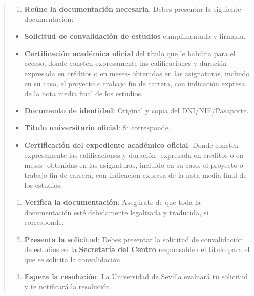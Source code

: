 \documentclass[12pt,a4paper,oneside]{report}
\begin{document}
\begin{itemize}
\begin{itemize}
\begin{quote}
\begin{enumerate}
  \item \textbf{Reúne la documentación necesaria}: Debes presentar la siguiente documentación:
\end{enumerate}
\begin{itemize}
  \item \textbf{Solicitud de convalidación de estudios} cumplimentada y firmada.
  \item \textbf{Certificación académica oficial} del título que le habilita para el acceso, donde consten expresamente las calificaciones y duración -expresada en créditos o en meses- obtenidas en las asignaturas, incluido en su caso, el proyecto o trabajo fin de carrera, con indicación expresa de la nota media final de los estudios.
  \item \textbf{Documento de identidad}: Original y copia del DNI/NIE/Pasaporte.
  \item \textbf{Título universitario oficial}: Si corresponde.
  \item \textbf{Certificación del expediente académico oficial}: Donde consten expresamente las calificaciones y duración -expresada en créditos o en meses- obtenidas en las asignaturas, incluido en su caso, el proyecto o trabajo fin de carrera, con indicación expresa de la nota media final de los estudios.
\end{itemize}
\begin{enumerate}
  \item \textbf{Verifica la documentación}: Asegúrate de que toda la documentación esté debidamente legalizada y traducida, si corresponde.
  \item \textbf{Presenta la solicitud}: Debes presentar la solicitud de convalidación de estudios en la \textbf{Secretaría del Centro} responsable del título para el que se solicita la convalidación.
  \item \textbf{Espera la resolución}: La Universidad de Sevilla evaluará tu solicitud y te notificará la resolución.
\end{enumerate}


\end{quote}
\end{itemize}
\end{itemize}
\end{document}
